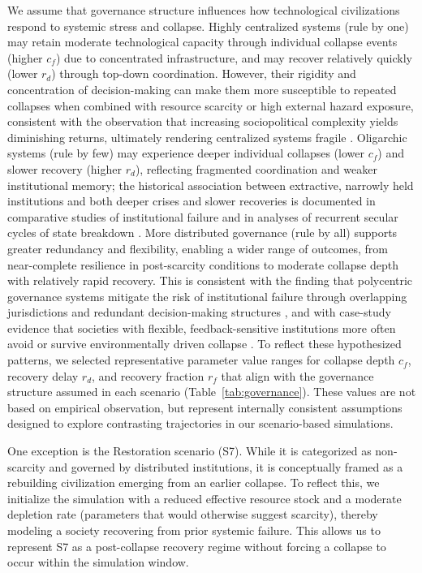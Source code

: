 We assume that governance structure influences how technological civilizations respond to systemic stress and collapse. Highly centralized systems (rule by one) may retain moderate technological capacity through individual collapse events (higher $c_f$) due to concentrated infrastructure, and may recover relatively quickly (lower $r_d$) through top-down coordination. However, their rigidity and concentration of decision-making can make them more susceptible to repeated collapses when combined with resource scarcity or high external hazard exposure, consistent with the observation that increasing sociopolitical complexity yields diminishing returns, ultimately rendering centralized systems fragile \citep{Tainter1988-cc}. Oligarchic systems (rule by few) may experience deeper individual collapses (lower $c_f$) and slower recovery (higher $r_d$), reflecting fragmented coordination and weaker institutional memory; the historical association between extractive, narrowly held institutions and both deeper crises and slower recoveries is documented in comparative studies of institutional failure \citep{Acemoglu2012-wn} and in analyses of recurrent secular cycles of state breakdown \citep{Turchin2009-sc}. More distributed governance (rule by all) supports greater redundancy and flexibility, enabling a wider range of outcomes, from near-complete resilience in post-scarcity conditions to moderate collapse depth with relatively rapid recovery. This is consistent with the finding that polycentric governance systems mitigate the risk of institutional failure through overlapping jurisdictions and redundant decision-making structures \citep{Ostrom2010-pg}, and with case-study evidence that societies with flexible, feedback-sensitive institutions more often avoid or survive environmentally driven collapse \citep{Diamond2005-co}. To reflect these hypothesized patterns, we selected representative parameter value ranges for collapse depth \(c_{f}\), recovery delay \(r_{d}\), and recovery fraction \(r_{f}\) that align with the governance structure assumed in each scenario (Table~\ref{tab:governance}). These values are not based on empirical observation, but represent internally consistent assumptions designed to explore contrasting trajectories in our scenario-based simulations.

One exception is the Restoration scenario (S7). While it is categorized as non-scarcity and governed by distributed institutions, it is conceptually framed as a rebuilding civilization emerging from an earlier collapse. To reflect this, we initialize the simulation with a reduced effective resource stock and a moderate depletion rate (parameters that would otherwise suggest scarcity), thereby modeling a society recovering from prior systemic failure. This allows us to represent S7 as a post-collapse recovery regime without forcing a collapse to occur within the simulation window.

